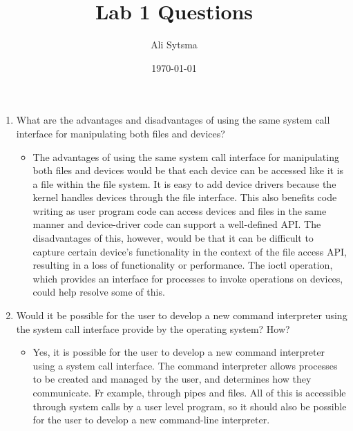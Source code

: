 \documentclass[12pt]{article}
\title{Lab 1 Questions}
\author{Ali Sytsma}
\date{\today}
\begin{document}
\maketitle


\begin{enumerate}
  \item What are the advantages and disadvantages of using the same system call interface for manipulating both files and devices? 
  \begin{itemize} 
  \item The advantages of using the same system call interface for manipulating both files and devices would be that each device can be accessed like it is a file within the file system. It is easy to add device drivers because the kernel handles devices through the file interface. This also benefits code writing as user program code can access devices and files in the same manner and device-driver code can support a well-defined API. The disadvantages of this, however, would be that it can be difficult to capture certain device’s functionality in the context of the file access API, resulting in a loss of functionality or performance. The ioctl operation, which provides an interface for processes to invoke operations on devices, could help resolve some of this.
  \end{itemize}
  \item Would it be possible for the user to develop a new command interpreter using the system call interface provide by the operating system? How?
  \begin{itemize} 
  \item Yes, it is possible for the user to develop a new command interpreter using a system call interface. The command interpreter allows processes to be created and managed by the user, and determines how they communicate. Fr example, through pipes and files. All of this is accessible through system calls by a user level program, so it should also be possible for the user to develop a new command-line interpreter.
  \end{itemize}
  
\end{enumerate}
\end{document}

